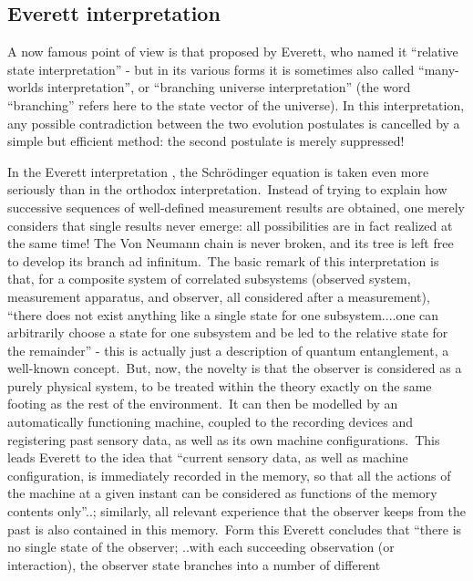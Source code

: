\documentclass[12pt,onecolumn]{article}%
\begin{document}
\subsection{Everett interpretation}

\label{ever}

A now famous point of view is that proposed by Everett, who named it
``relative state interpretation'' - but in its various forms it is sometimes
also called ``many-worlds interpretation'', or ``branching universe
interpretation'' (the word ``branching'' refers here to the state vector of
the universe). In this interpretation, any possible contradiction between the
two evolution postulates is cancelled by a simple but efficient method: the
second postulate is merely suppressed!

In the Everett interpretation \cite{Everett}, the Schr\"{o}dinger equation is
taken even more seriously than in the orthodox interpretation.\ Instead of
trying to explain how successive sequences of well-defined measurement results
are obtained, one merely considers that single results never emerge: all
possibilities are in fact realized at the same time! The Von Neumann chain is
never broken, and its tree is left free to develop its branch ad
infinitum.\ The basic remark of this interpretation is that, for a composite
system of correlated subsystems (observed system, measurement apparatus, and
observer, all considered after a measurement), ``there does not exist anything
like a single state for one subsystem....one can arbitrarily choose a state
for one subsystem and be led to the relative state for the remainder'' - this
is actually just a description of quantum entanglement, a well-known
concept.\ But, now, the novelty is that the observer is considered as a purely
physical system, to be treated within the theory exactly on the same footing
as the rest of the environment.\ It can then be modelled by an automatically
functioning machine, coupled to the recording devices and registering past
sensory data, as well as its own machine configurations.\ This leads Everett
to the idea that ``current sensory data, as well as machine configuration, is
immediately recorded in the memory, so that all the actions of the machine at
a given instant can be considered as functions of the memory contents
only''..; similarly, all relevant experience that the observer keeps from the
past is also contained in this memory.\ Form this Everett concludes that
``there is no single state of the observer; ..with each succeeding observation
(or interaction), the observer state branches into a number of different
\end{document}
